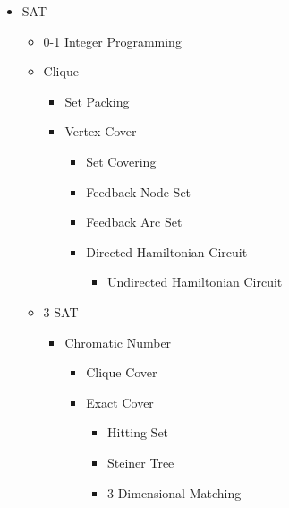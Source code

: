 
    \begin{itemize}
        \item SAT
        \begin{itemize}
            \item 0-1 Integer Programming
            \item Clique
            \begin{itemize}
                \item Set Packing
                \item Vertex Cover
                \begin{itemize}
                    \item Set Covering
                    \item Feedback Node Set
                    \item Feedback Arc Set
                    \item Directed Hamiltonian Circuit
                    \begin{itemize}
                        \item Undirected Hamiltonian Circuit  
                    \end{itemize}
                \end{itemize}
            \end{itemize}
            \item 3-SAT
            \begin{itemize}
                \item Chromatic Number  
                \begin{itemize}
                    \item Clique Cover
                    \item Exact Cover
                    \begin{itemize}
                        \item Hitting Set
                        \item Steiner Tree
                        \item 3-Dimensional Matching

\end{itemize}
\end{itemize}
\end{itemize}
\end{itemize}
\end{itemize}
